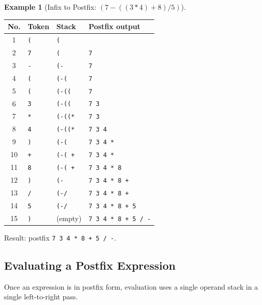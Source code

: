 \documentclass[11pt, a4paper, notitlepage]{report}
\theoremstyle{definition}
\theoremstyle{remark}
\theoremstyle{definition}
\newtheorem{example}[theorem]{Example}
\begin{document}
\begin{example}[Infix to Postfix: $(7 - ((3 * 4) + 8) / 5)$]
\label{ex:infix-to-postfix-full}

\begin{center}
\begin{tabularx}{\linewidth}{@{} c l l l @{}}
\toprule
\textbf{No.} & \textbf{Token} & \textbf{Stack} & \textbf{Postfix output} \\
\midrule
1  & \texttt{(} & \texttt{(}       & \\
2  & \texttt{7} & \texttt{(}       & \texttt{7} \\
3  & \texttt{-} & \texttt{(-}      & \texttt{7} \\
4  & \texttt{(} & \texttt{(-(}     & \texttt{7} \\
5  & \texttt{(} & \texttt{(-((}    & \texttt{7} \\
6  & \texttt{3} & \texttt{(-((}    & \texttt{7 3} \\
7  & \texttt{*} & \texttt{(-((*}   & \texttt{7 3} \\
8  & \texttt{4} & \texttt{(-((*}   & \texttt{7 3 4} \\
9  & \texttt{)} & \texttt{(-(}     & \texttt{7 3 4 *} \\
10 & \texttt{+} & \texttt{(-( +}   & \texttt{7 3 4 *} \\
11 & \texttt{8} & \texttt{(-( +}   & \texttt{7 3 4 * 8} \\
12 & \texttt{)} & \texttt{(-}      & \texttt{7 3 4 * 8 +} \\
13 & \texttt{/} & \texttt{(-/}     & \texttt{7 3 4 * 8 +} \\
14 & \texttt{5} & \texttt{(-/}     & \texttt{7 3 4 * 8 + 5} \\
15 & \texttt{)} & (empty)          & \texttt{7 3 4 * 8 + 5 / -} \\
\bottomrule
\end{tabularx}
\end{center}

Result: postfix \texttt{7 3 4 * 8 + 5 / -}.
\end{example}

\subsection{Evaluating a Postfix Expression}
\label{subsec:eval-postfix}

Once an expression is in postfix form, evaluation uses a single operand stack in a
single left-to-right pass.
\end{document}

